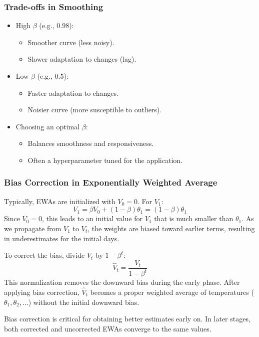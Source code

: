 \documentclass[letterpaper,12pt,notitlepage,twoside]{report}
\begin{document}
\subsubsection{Trade-offs in Smoothing}
\begin{itemize}
    \item High \( \beta \) (e.g., \( 0.98 \)):
    \begin{itemize}
        \item Smoother curve (less noisy).
        \item Slower adaptation to changes (lag).
    \end{itemize}
    \item Low \( \beta \) (e.g., \( 0.5 \)):
    \begin{itemize}
        \item Faster adaptation to changes.
        \item Noisier curve (more susceptible to outliers).
    \end{itemize}
    \item Choosing an optimal \( \beta \):
    \begin{itemize}
        \item Balances smoothness and responsiveness.
        \item Often a hyperparameter tuned for the application.
    \end{itemize}
\end{itemize}

\subsubsection{Bias Correction in Exponentially Weighted Average}
Typically, EWAs are initialized with \( V_0 = 0\).  For \( V_1 \):  
     \[
     V_1 = \beta V_0 + (1 - \beta) \theta_1 = (1 - \beta) \theta_1
     \]  
Since \( V_0 = 0 \), this leads to an initial value for \( V_1 \) that is much smaller than \( \theta_1 \).  As we propagate from \(V_1\) to \(V_t\), the weights are biased toward earlier terms, resulting in underestimates for the initial days.  

To correct the bias, divide \( V_t \) by \( 1 - \beta^t \):  
   \[
   \hat{V}_t = \frac{V_t}{1 - \beta^t} 
   \]  
This normalization removes the downward bias during the early phase. After applying bias correction, \( \hat{V}_t \) becomes a proper weighted average of temperatures (\( \theta_1, \theta_2, \dots \)) without the initial downward bias.  

Bias correction is critical for obtaining better estimates early on.  In later stages, both corrected and uncorrected EWAs converge to the same values.  
\end{document}
